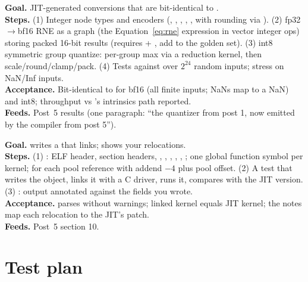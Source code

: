 \textbf{Goal.} JIT-generated conversions that are bit-identical to .\\
\textbf{Steps.} (1) Integer node types and encoders (, , , , ,  with rounding via ). (2) fp32$\to$bf16 RNE as a graph (the Equation~\eqref{eq:rne} expression in vector integer ops) storing packed 16-bit results (requires  + , add to the golden set). (3) int8 symmetric group quantize: per-group max via a reduction kernel, then scale/round/clamp/pack. (4) Tests against  over $2^{24}$ random inputs; stress on NaN/Inf inputs.\\
\textbf{Acceptance.} Bit-identical to  for bf16 (all finite inputs; NaNs map to a NaN) and int8; throughput vs 's intrinsics path reported.\\
\textbf{Feeds.} Post~5 results (one paragraph: ``the quantizer from post 1, now emitted by the compiler from post 5'').

\textbf{Goal.}  writes a  that  links;  shows your relocations.\\
\textbf{Steps.} (1) : ELF header, section headers, , , , , , ; one global function symbol per kernel;  for each pool reference with addend $-4$ plus pool offset. (2) A test that writes the object, links it with a C driver, runs it, compares with the JIT version. (3) :  output annotated against the fields you wrote.\\
\textbf{Acceptance.}  parses without warnings; linked kernel equals JIT kernel; the notes map each relocation to the JIT's patch.\\
\textbf{Feeds.} Post~5 section 10.

\section{Test plan}
\label{sec:p5tests}

